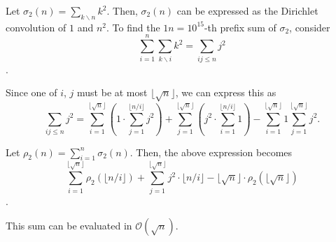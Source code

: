 \documentclass{article}
\begin{document}
Let $\sigma_2(n)=\sum_{k\backslash n}k^2$. Then, $\sigma_2(n)$ can be expressed as the Dirichlet convolution of $1$ and $n^2$. To find the $1n=10^{15}$-th prefix sum of $\sigma_2$, consider $$\sum_{i=1}^n\sum_{k\backslash i}k^2=\sum_{ij\leq n}j^2$$. 

Since one of $i$, $j$ must be at most $\lfloor \sqrt{n}\rfloor$, we can express this as $$\sum_{ij\leq n}j^2=\sum_{i=1}^{\lfloor\sqrt{n}\rfloor}\left(1\cdot\sum_{j=1}^{\lfloor n/i\rfloor}j^2\right)+\sum_{j=1}^{\lfloor\sqrt{n}\rfloor}\left(j^2\cdot\sum_{i=1}^{\lfloor n/i \rfloor}1\right)-\sum_{i=1}^{\lfloor\sqrt{n}\rfloor}1\sum_{j=1}^{\lfloor\sqrt{n}\rfloor}j^2.$$

Let $\rho_2(n)=\sum_{i=1}^n\sigma_2(n)$. Then, the above expression becomes $$\sum_{i=1}^{\lfloor\sqrt{n}\rfloor}\rho_2(\lfloor n/i \rfloor)+\sum_{j=1}^{\lfloor\sqrt{n}\rfloor}j^2\cdot\lfloor n/i\rfloor-\lfloor\sqrt{n}\rfloor\cdot\rho_2(\lfloor\sqrt{n}\rfloor)$$.

This sum can be evaluated in $\mathcal{O}(\sqrt{n})$. 
\end{document}

